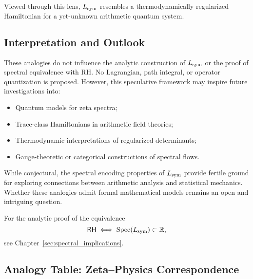 Viewed through this lens, \( L_{\mathrm{sym}} \) resembles a thermodynamically regularized Hamiltonian for a yet-unknown arithmetic quantum system.

\subsection*{Interpretation and Outlook}

These analogies do not influence the analytic construction of \( L_{\mathrm{sym}} \) or the proof of spectral equivalence with RH. No Lagrangian, path integral, or operator quantization is proposed. However, this speculative framework may inspire future investigations into:

\begin{itemize}
  \item Quantum models for zeta spectra;
  \item Trace-class Hamiltonians in arithmetic field theories;
  \item Thermodynamic interpretations of regularized determinants;
  \item Gauge-theoretic or categorical constructions of spectral flows.
\end{itemize}

\medskip
\noindent
While conjectural, the spectral encoding properties of \( L_{\mathrm{sym}} \) provide fertile ground for exploring connections between arithmetic analysis and statistical mechanics. Whether these analogies admit formal mathematical models remains an open and intriguing question.

\medskip
\noindent
For the analytic proof of the equivalence
\[
\mathsf{RH} \iff \operatorname{Spec}(L_{\mathrm{sym}}) \subset \mathbb{R},
\]
see Chapter~\ref{sec:spectral_implications}.

\subsection*{Analogy Table: Zeta–Physics Correspondence}

